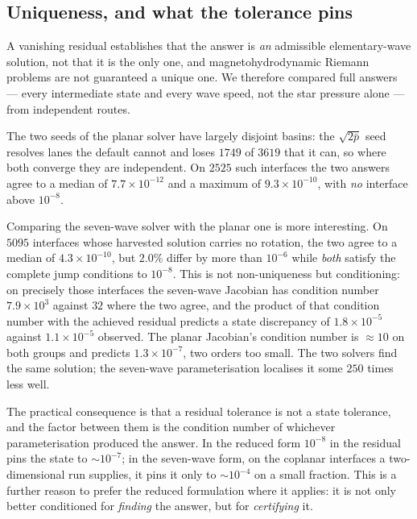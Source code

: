 \subsection{Uniqueness, and what the tolerance pins}
\label{sec:planar:unique}

A vanishing residual establishes that the answer is \emph{an} admissible
elementary-wave solution, not that it is the only one, and magnetohydrodynamic
Riemann problems are not guaranteed a unique one. We therefore compared full
answers --- every intermediate state and every wave speed, not the star
pressure alone --- from independent routes.

The two seeds of the planar solver have largely disjoint basins: the
$\sqrt{2\bar{p}}$ seed resolves lanes the default cannot and loses $1749$ of
$3619$ that it can, so where both converge they are independent. On $2525$
such interfaces the two answers agree to a median of $7.7\times10^{-12}$ and a
maximum of $9.3\times10^{-10}$, with \emph{no} interface above $10^{-8}$.

Comparing the seven-wave solver with the planar one is more interesting. On
$5095$ interfaces whose harvested solution carries no rotation, the two agree
to a median of $4.3\times10^{-10}$, but $2.0\%$ differ by more than $10^{-6}$
while \emph{both} satisfy the complete jump conditions to $10^{-8}$. This is
not non-uniqueness but conditioning: on precisely those interfaces the
seven-wave Jacobian has condition number $7.9\times10^{3}$ against $32$ where
the two agree, and the product of that condition number with the achieved
residual predicts a state discrepancy of $1.8\times10^{-5}$ against
$1.1\times10^{-5}$ observed. The planar Jacobian's condition number is
$\approx 10$ on both groups and predicts $1.3\times10^{-7}$, two orders too
small. The two solvers find the same solution; the seven-wave
parameterisation localises it some $250$ times less well.

The practical consequence is that a residual tolerance is not a state
tolerance, and the factor between them is the condition number of whichever
parameterisation produced the answer. In the reduced form $10^{-8}$ in the
residual pins the state to $\sim\!10^{-7}$; in the seven-wave form, on the
coplanar interfaces a two-dimensional run supplies, it pins it only to
$\sim\!10^{-4}$ on a small fraction. This is a further reason to prefer the
reduced formulation where it applies: it is not only better conditioned for
\emph{finding} the answer, but for \emph{certifying} it.

